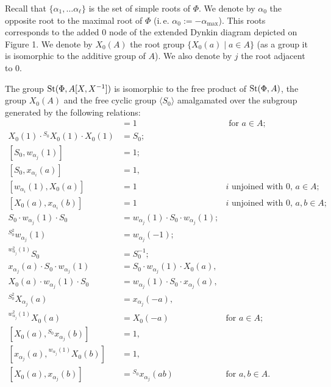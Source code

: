 Recall that $\{ \alpha_1, \ldots \alpha_\ell \}$ is the set of simple roots of $\Phi$.
We denote by $\alpha_0$ the opposite root to the maximal root of $\Phi$ (i.\,e. $\alpha_0 := -\alpha_\mathrm{max}$).
This roots corresponds to the added $0$ node of the extended Dynkin diagram depicted on Figure 1.
We denote by $X_0(A)$ the root group $\{ X_0(a) \mid a \in A\}$ (as a group it is isomorphic to the additive group of $A$).
We also denote by $j$ the root adjacent to $0$.
\begin{prop} \label{prop:Allcock-affine} The group $\operatorname{St}(\Phi, A[X, X^{-1}])$ is isomorphic to the free product of $\operatorname{St}(\Phi, A)$, the group $X_0(A)$ and the free cyclic group $\langle S_0 \rangle$
     amalgamated over the subgroup generated by the following relations:
    \begin{align}
        [S_0^2, X_0(a)] & = 1 & \text{ for $a \in A$; } \label{eq:Allcock-2} \\
        X_0(1) \cdot {}^{S_0} X_0(1) \cdot X_0(1) & = S_0; \label{eq:Allcock-3} \\
        [S_0, w_{\alpha_j}(1)] & = 1; &  \label{eq:Allcock-4} \\
        [S_0, x_{\alpha_i}(a)] & = 1, &  \label{eq:Allcock-5-1}\\
        [w_{\alpha_i}(1), X_0(a)] & = 1 & \text{$i$ unjoined with $0$, $a \in A;$} \label{eq:Allcock-5-2} \\
        [X_0(a), x_{\alpha_i}(b)] & = 1 & \text{$i$ unjoined with $0$, $a, b \in A;$} \label{eq:Allcock-6} \\
        S_0 \cdot w_{\alpha_j}(1) \cdot S_0 & = w_{\alpha_j}(1) \cdot S_0 \cdot w_{\alpha_j}(1); \label{eq:Allcock-7} \\
        {}^{S_0^2} w_{\alpha_j}(1) & = w_{\alpha_j}(-1); \label{eq:Allcock-8-1} \\
        {}^{w_{\alpha_j}^2(1)} S_0 & = S_0^{-1}; \label{eq:Allcock-8-2} \\
        x_{\alpha_j}(a) \cdot S_0 \cdot w_{\alpha_j}(1) & = S_0 \cdot w_{\alpha_j}(1) \cdot X_0(a), & \label{eq:Allcock-9-1} \\
        X_0(a) \cdot w_{\alpha_j}(1) \cdot S_0 & = w_{\alpha_j}(1) \cdot S_0 \cdot x_{\alpha_j}(a), & \label{eq:Allcock-9-2} \\
        {}^{S_0^2} X_{\alpha_j}(a) & = x_{\alpha_j}(-a), & \label{eq:Allcock-10-1} \\
        {}^{w_{\alpha_j}^2(1)} X_0(a) & = X_0(-a) & \text{for $a \in A;$} \label{eq:Allcock-10-2} \\
        [X_0(a), {}^{S_0} x_{\alpha_j}(b)] &= 1, & \label{eq:Allcock-11-1} \\
        [x_{\alpha_j}(a), {}^{w_{\alpha_j}(1)}X_0(b)] &= 1, & \label{eq:Allcock-11-2} \\
        [X_0(a), x_{\alpha_j}(b)] &= {}^{S_0} x_{\alpha_j}(ab) & \text{for $a, b \in A.$} \label{eq:Allcock-12}
    \end{align}
\end{prop}
